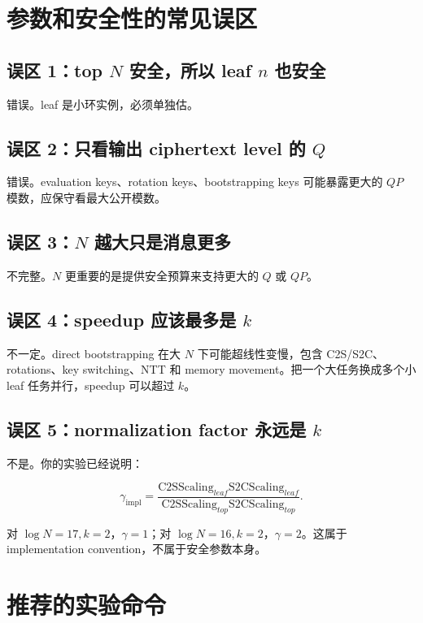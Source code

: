 \documentclass[UTF8,11pt,a4paper]{ctexart}
\begin{document}
\section{参数和安全性的常见误区}

\subsection{误区 1：top $N$ 安全，所以 leaf $n$ 也安全}

错误。leaf 是小环实例，必须单独估。

\subsection{误区 2：只看输出 ciphertext level 的 $Q$}

错误。evaluation keys、rotation keys、bootstrapping keys 可能暴露更大的 $QP$ 模数，应保守看最大公开模数。

\subsection{误区 3：$N$ 越大只是消息更多}

不完整。$N$ 更重要的是提供安全预算来支持更大的 $Q$ 或 $QP$。

\subsection{误区 4：speedup 应该最多是 $k$}

不一定。direct bootstrapping 在大 $N$ 下可能超线性变慢，包含 C2S/S2C、rotations、key switching、NTT 和 memory movement。把一个大任务换成多个小 leaf 任务并行，speedup 可以超过 $k$。

\subsection{误区 5：normalization factor 永远是 $k$}

不是。你的实验已经说明：

\[
\gamma_{\mathrm{impl}}
=
\frac{
\mathrm{C2SScaling}_{leaf}
\mathrm{S2CScaling}_{leaf}
}{
\mathrm{C2SScaling}_{top}
\mathrm{S2CScaling}_{top}
}.
\]

对 $\log N=17,k=2$，$\gamma=1$；对 $\log N=16,k=2$，$\gamma=2$。这属于 implementation convention，不属于安全参数本身。

\section{推荐的实验命令}
\end{document}
